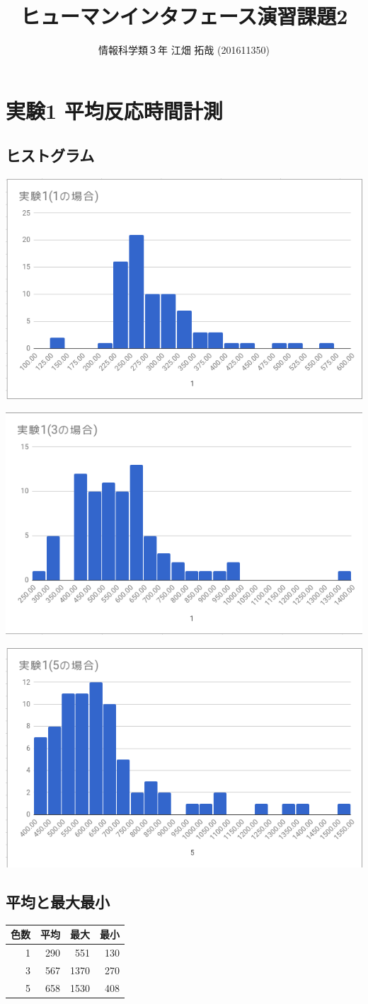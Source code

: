 \documentclass{scrartcl}
\author{情報科学類３年 江畑 拓哉 (201611350)}
\date{}
\title{ヒューマンインタフェース演習課題2}
\begin{document}
\maketitle
\tableofcontents

\section{実験1 平均反応時間計測}
\label{sec:org1843a15}
\subsection{ヒストグラム}
\label{sec:orga98673c}
\begin{center}
\includegraphics[width=0.5\linewidth]{./1-1.png}
\end{center}
\begin{center}
\includegraphics[width=0.5\linewidth]{./1-3.png}
\end{center}
\begin{center}
\includegraphics[width=0.5\linewidth]{./1-5.png}
\end{center}
\subsection{平均と最大最小}
\label{sec:orgca670c4}
\begin{center}
\begin{tabular}{rrrr}
\hline
色数 & 平均 & 最大 & 最小\\
\hline
1 & 290 & 551 & 130\\
3 & 567 & 1370 & 270\\
5 & 658 & 1530 & 408\\
\hline
\end{tabular}
\end{center}
\end{document}
